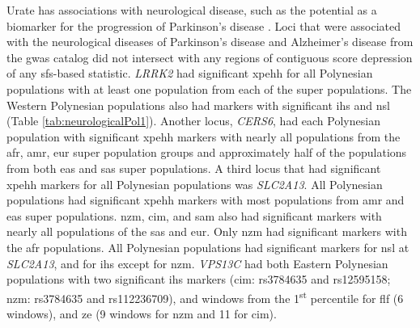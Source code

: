 \documentclass[twoside,openright]{report}
\begin{document}
Urate has associations with neurological disease, such as the potential
as a biomarker for the progression of Parkinson's disease
\citep{Wen2017}. Loci that were associated with the neurological
diseases of Parkinson's disease and Alzheimer's disease from the
\gls{gwas} catalog did not intersect with any regions of contiguous
score depression of any \gls{sfs}-based statistic. \emph{LRRK2} had
significant \gls{xpehh} for all Polynesian populations with at least one
population from each of the super populations. The Western Polynesian
populations also had markers with significant \gls{ihs} and \gls{nsl}
(Table \ref{tab:neurologicalPol1}). Another locus, \emph{CERS6}, had
each Polynesian population with significant \gls{xpehh} markers with
nearly all populations from the \gls{afr}, \gls{amr}, \gls{eur} super
population groups and approximately half of the populations from both
\gls{eas} and \gls{sas} super populations. A third locus that had
significant \gls{xpehh} markers for all Polynesian populations was
\emph{SLC2A13}. All Polynesian populations had significant \gls{xpehh}
markers with most populations from \gls{amr} and \gls{eas} super
populations. \Gls{nzm}, \gls{cim}, and \gls{sam} also had significant
markers with nearly all populations of the \gls{sas} and \gls{eur}. Only
\gls{nzm} had significant markers with the \gls{afr} populations. All
Polynesian populations had significant markers for \gls{nsl} at
\emph{SLC2A13}, and for \gls{ihs} except for \gls{nzm}. \emph{VPS13C}
had both Eastern Polynesian populations with two significant \gls{ihs}
markers (\gls{cim}: rs3784635 and rs12595158; \gls{nzm}: rs3784635 and
rs112236709), and windows from the 1\textsuperscript{st} percentile for
\gls{flf} (6 windows), and \gls{ze} (9 windows for \gls{nzm} and 11 for
\gls{cim}).

\begingroup\fontsize{8}{10}\selectfont
\end{document}
